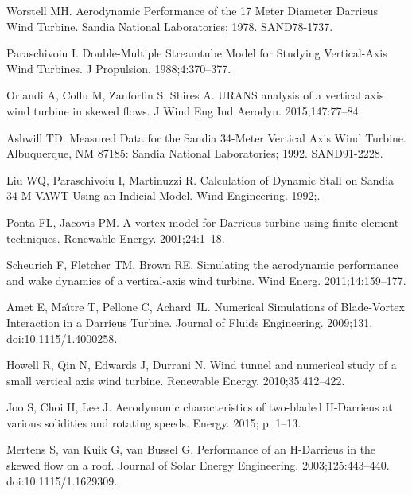 \documentclass[10pt,letterpaper]{article}
\begin{document}
\begin{thebibliography}{10}
    Worstell MH.
    \newblock Aerodynamic Performance of the 17 Meter Diameter {Darrieus} Wind
      Turbine.
    \newblock Sandia National Laboratories; 1978. SAND78-1737.

    Paraschivoiu I.
    \newblock Double-Multiple Streamtube Model for Studying Vertical-Axis Wind
      Turbines.
    \newblock J Propulsion. 1988;4:370--377.

    Orlandi A, Collu M, Zanforlin S, Shires A.
     {URANS} analysis of a vertical axis wind turbine in skewed
      flows.
    \newblock J Wind Eng Ind Aerodyn. 2015;147:77--84.

    Ashwill TD.
    \newblock Measured Data for the {S}andia 34-Meter Vertical Axis Wind Turbine.
    \newblock Albuquerque, NM 87185: Sandia National Laboratories; 1992.
      SAND91-2228.

    Liu WQ, Paraschivoiu I, Martinuzzi R.
    \newblock Calculation of Dynamic Stall on {S}andia 34-M {VAWT} Using an
      Indicial Model.
    \newblock Wind Engineering. 1992;.

    Ponta FL, Jacovis PM.
    \newblock A vortex model for Darrieus turbine using finite element techniques.
    \newblock Renewable Energy. 2001;24:1--18.

    Scheurich F, Fletcher TM, Brown RE.
    \newblock Simulating the aerodynamic performance and wake dynamics of a
      vertical-axis wind turbine.
    \newblock Wind Energ. 2011;14:159--177.

    Amet E, Ma{\^\i}tre T, Pellone C, Achard JL.
     Numerical Simulations of Blade-Vortex Interaction in a
      {D}arrieus Turbine.
    \newblock Journal of Fluids Engineering. 2009;131.
    \newblock doi:{10.1115/1.4000258}.

    Howell R, Qin N, Edwards J, Durrani N.
    \newblock Wind tunnel and numerical study of a small vertical axis wind
      turbine.
    \newblock Renewable Energy. 2010;35:412--422.

    Joo S, Choi H, Lee J.
    \newblock Aerodynamic characteristics of two-bladed H-Darrieus at various
      solidities and rotating speeds.
    \newblock Energy. 2015; p. 1--13.

    Mertens S, van Kuik G, van Bussel G.
    \newblock Performance of an {H}-{D}arrieus in the skewed flow on a roof.
    \newblock Journal of Solar Energy Engineering. 2003;125:443--440.
    \newblock doi:{10.1115/1.1629309}.


\end{thebibliography}
\end{document}
